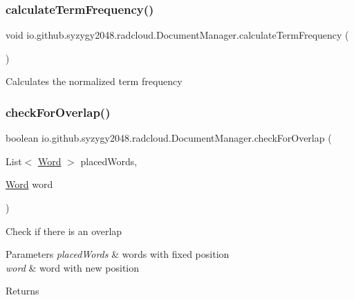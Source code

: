 \subsubsection{\texorpdfstring{calculate\+Term\+Frequency()}{calculateTermFrequency()}}
{\footnotesize\ttfamily void io.\+github.\+syzygy2048.\+radcloud.\+Document\+Manager.\+calculate\+Term\+Frequency (\begin{DoxyParamCaption}{ }\end{DoxyParamCaption})\hspace{0.3cm}{\ttfamily [private]}}

Calculates the normalized term frequency \mbox{\label{classio_1_1github_1_1syzygy2048_1_1radcloud_1_1_document_manager_a46efa97bb7935e67250b7386c2c31da7}} 
\subsubsection{\texorpdfstring{check\+For\+Overlap()}{checkForOverlap()}}
{\footnotesize\ttfamily boolean io.\+github.\+syzygy2048.\+radcloud.\+Document\+Manager.\+check\+For\+Overlap (\begin{DoxyParamCaption}\item[{List$<$ \mbox{\hyperlink{classio_1_1github_1_1syzygy2048_1_1radcloud_1_1_word}{Word}} $>$}]{placed\+Words,  }\item[{\mbox{\hyperlink{classio_1_1github_1_1syzygy2048_1_1radcloud_1_1_word}{Word}}}]{word }\end{DoxyParamCaption})\hspace{0.3cm}{\ttfamily [private]}}

Check if there is an overlap 
\begin{DoxyParams}{Parameters}
{\em placed\+Words} & words with fixed position \\
\hline
{\em word} & word with new position \\
\hline
\end{DoxyParams}
\begin{DoxyReturn}{Returns}

\end{DoxyReturn}
\mbox{\label{classio_1_1github_1_1syzygy2048_1_1radcloud_1_1_document_manager_a0cc957e8369ea7136b5b7eacc4ce8a13}} 
